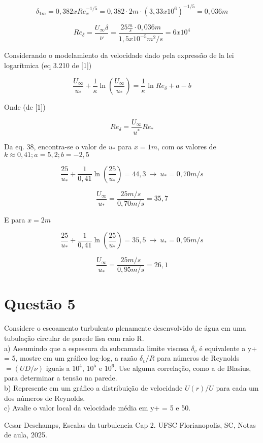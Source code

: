 \documentclass[12pt]{article}
\begin{document}
\begin{equation}
	\delta_{1m}= 0,382 x Re_x^{-1/5} = 0,382 \cdot 2m \cdot (3,33 x 10 ^ {6})^{-1/5} = 0,036 m
\end{equation}

\begin{equation}
	Re_\delta = \frac{U_\infty \delta}{\nu} = \frac{25 \frac{m}{s} \cdot 0,036m}{1,5 x 10 ^{-5} m^2 / s} = 6 x 10 ^ 4
\end{equation}

Considerando o modelamiento da velocidade dado pela expressão de la lei logarítmica (eq 3.210 de [1])

\begin{equation}
	\frac{U_\infty}{u_*} + \frac{1}{\kappa} \ln\left( \frac{U_\infty}{u_*} \right)
	= \frac{1}{\kappa} \ln Re_\delta + a - b
\end{equation}

Onde (de [1])

\begin{equation}
	Re_\delta = \dfrac{U_\infty}{u^*} Re_*
\end{equation}

Da eq. 38, encontra-se o valor de $u_*$ para $x=1m$, com os valores de $k\approx 0,41 ; a = 5,2 ; b = -2,5$

\begin{equation}
	\frac{25}{u_*} + \frac{1}{0,41} \ln\left( \frac{25}{u_*} \right)
	= 44,3\  \rightarrow \ u_*= 0,70 m/s
\end{equation}

\begin{equation}
	\frac{U_\infty}{u_*} = \frac{25 m/s}{0,70m/s} = 35,7
\end{equation}


E para $x = 2m$

\begin{equation}
	\frac{25}{u_*} + \frac{1}{0,41} \ln\left( \frac{25}{u_*} \right)
	= 35,5 \  \rightarrow \ u_*= 0,95 m/s
\end{equation}

\begin{equation}
	\frac{U_\infty}{u_*} = \frac{25 m/s}{0,95m/s} = 26,1
\end{equation}

\section*{Questão 5}

Considere o escoamento turbulento plenamente desenvolvido de água em uma tubulação
circular de parede lisa com raio R.\\
a) Assumindo que a espessura da subcamada limite viscosa $\delta_v$ é equivalente a y+ = 5, mostre
em um gráfico log-log, a razão $\delta_v/R$ para números de Reynolds $=( UD/\nu)$ iguais a $10^4$, $10^5$ e $10^6$. Use alguma correlação, como a de Blasius, para determinar a tensão na parede.\\
b) Represente em um gráfico a distribuição de velocidade $U(r)/U$ para cada um dos números de
Reynolds.\\
c) Avalie o valor local da velocidade média em y+ = 5 e 50.



\begin{thebibliography}{999}
	
	
	Cesar Deschamps,
	Escalas da turbulencia Cap 2.
	UFSC Florianopolis, SC,
	Notas de aula,
	2025.
		
	
\end{thebibliography}
\end{document}
